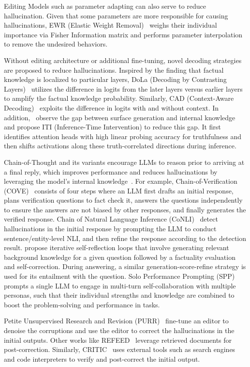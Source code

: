 Editing Models such as parameter adapting can also serve to reduce hallucination.
Given that some parameters are more responsible for causing hallucinations, EWR (Elastic Weight Removal)~ weighs their individual importance via Fisher Information matrix and performs parameter interpolation to remove the undesired behaviors.

Without editing architecture or additional fine-tuning, novel decoding strategies are proposed to reduce hallucinations.
Inspired by the finding that factual knowledge is localized to particular layers, DoLa (Decoding by Contrasting Layers)~ utilizes the difference in logits from the later layers versus earlier layers to amplify the factual knowledge probability. 
Similarly, CAD (Context-Aware Decoding)~ exploits the difference in logits with and without context.
In addition,~ observe the gap between surface generation and internal knowledge and propose ITI (Inference-Time Intervention) to reduce this gap. It first identifies attention heads with high linear probing accuracy for truthfulness and then shifts activations along these truth-correlated directions during inference.

Chain-of-Thought and its variants encourage LLMs to reason prior to arriving at a final reply, which improves performance and reduces hallucinations by leveraging the model's internal knowledge~. 
For example, Chain-of-Verification (COVE)~ consists of four steps where an LLM first drafts an initial response, plans verification questions to fact check it, answers the questions independently to ensure the answers are not biased by other responses, and finally generates the verified response. 
Chain of Natural Language Inference (CoNLI)~ detect hallucinations in the initial response by prompting the LLM to conduct sentence/entity-level NLI, and then refine the response according to the detection result.
 propose iterative self-reflection loops that involve generating relevant background knowledge for a given question followed by a factuality evaluation and self-correction. During answering, a similar generation-score-refine strategy is used for its entailment with the question.
Solo Performance Prompting (SPP)~ prompts a single LLM to engage in multi-turn self-collaboration with multiple personas, such that their individual strengths and knowledge are combined to boost the problem-solving and performance in tasks.

Petite Unsupervised Research and Revision (PURR)~ fine-tune an editor to denoise the corruptions and use the editor to correct the hallucinations in the initial outputs.
Other works like REFEED~ leverage retrieved documents for post-correction.
Similarly, CRITIC~ uses external tools such as search engines and code interpreters to verify and post-correct the initial output.

